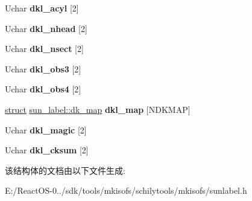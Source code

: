 \begin{DoxyCompactItemize}
\mbox{\label{structsun__label_a99e771f024c9be8da6a705fcd8755b86}} 
Uchar {\bfseries dkl\+\_\+acyl} \mbox{[}2\mbox{]}
\item 
\mbox{\label{structsun__label_a6725dff954d9eb28f0ae2c6c9631ac3a}} 
Uchar {\bfseries dkl\+\_\+nhead} \mbox{[}2\mbox{]}
\item 
\mbox{\label{structsun__label_ab5940d7ac120f149dcf301075dcf73e5}} 
Uchar {\bfseries dkl\+\_\+nsect} \mbox{[}2\mbox{]}
\item 
\mbox{\label{structsun__label_adb0d62c51b71452831543ef898357259}} 
Uchar {\bfseries dkl\+\_\+obs3} \mbox{[}2\mbox{]}
\item 
\mbox{\label{structsun__label_ae2cddb293466ad05f742a854237404e4}} 
Uchar {\bfseries dkl\+\_\+obs4} \mbox{[}2\mbox{]}
\item 
\mbox{\label{structsun__label_ae3f6f70ef0d9ee9dbf922ad9997ea042}} 
\hyperlink{interfacestruct}{struct} \hyperlink{structsun__label_1_1dk__map}{sun\+\_\+label\+::dk\+\_\+map} {\bfseries dkl\+\_\+map} \mbox{[}N\+D\+K\+M\+AP\mbox{]}
\item 
\mbox{\label{structsun__label_a674829f6d76a24f21ac735c691bdc625}} 
Uchar {\bfseries dkl\+\_\+magic} \mbox{[}2\mbox{]}
\item 
\mbox{\label{structsun__label_a9ebeb43556f7b1f2e5ee9b59a1c58fbe}} 
Uchar {\bfseries dkl\+\_\+cksum} \mbox{[}2\mbox{]}
\end{DoxyCompactItemize}


该结构体的文档由以下文件生成\+:\begin{DoxyCompactItemize}
\item 
E\+:/\+React\+O\+S-\/0../sdk/tools/mkisofs/schilytools/mkisofs/sunlabel.\+h\end{DoxyCompactItemize}
